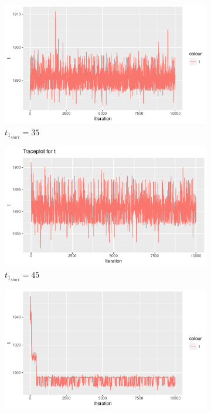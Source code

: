 \begin{figure}[h]
    \centering
    \begin{subfigure}[b]{0.49\textwidth}
        \centering
        \includegraphics[width = \textwidth]{Images/sim_t_start_35.pdf}
        \caption{$t_{1_{start}} = 35$}
        \label{fig:sim_t_diff_start_35}
    \end{subfigure}
    \begin{subfigure}[b]{0.49\textwidth}
        \centering
        \includegraphics[width = \textwidth]{Images/sim_t.pdf}
        \caption{$t_{1_{start}} = 45$}
        \label{fig:sim_t_diff_start_45}
    \end{subfigure}
    \begin{subfigure}[b]{0.49\textwidth}
        \centering
        \includegraphics[width = \textwidth]{Images/sim_t_start_90.pdf}

\end{subfigure}
\end{figure}
